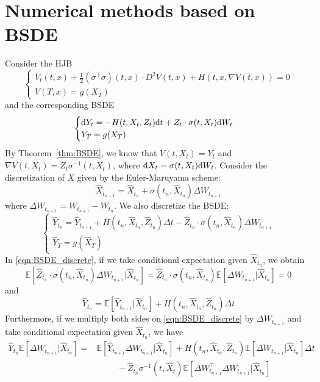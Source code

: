 \documentclass[11pt]{book}
\newcommand{\dd}{\text{\normalfont d}}
\newcommand{\dt}{\text{\normalfont d}t}
\newcommand{\dW}{\text{\normalfont d}W}
\begin{document}
    \section{Numerical methods based on BSDE}
\label{eqn:BSDE_numerical}
Consider the HJB
\begin{equation}
    \begin{cases}
    V_t(t,x)+\frac12(\sigma^{\intercal}\sigma)(t,x)\cdot D^2 V(t,x) + H(t,x,\nabla V(t,x)) = 0\\
    V(T,x) = g(X_T)
    \end{cases}
\end{equation}
and the corresponding BSDE
\begin{equation}
    \begin{cases}
        \dd Y_t = -H(t,{X}_t,Z_t)\dt + Z_t\cdot\sigma(t,X_t)\dW_t\\
        Y_T=g({X}_T)
    \end{cases}
\end{equation}
By Theorem~\eqref{thm:BSDE}, we know that $V(t,X_t) = Y_t$ and $\nabla V(t,X_t) = Z_t\sigma^{-1}(t,X_t)$, where $\dd X_t=\sigma(t,X_t)\dW_t$. 
Consider the discretization of $X$ given by the Euler-Maruyama scheme:
\[
\hat{X}_{t_{n+1}}=\hat{X}_{t_{n}} + \sigma(t_n,\hat{X}_{t_{n}})\Delta W_{t_{n+1}}
\]
where $\Delta W_{t_{n+1}}= W_{t_{n+1}}- W_{t_{n}}$.
We also discretize the BSDE:
\begin{equation}
\label{eqn:BSDE_discrete}
    \begin{cases}
        \hat{Y}_{t_n} = \hat{Y}_{t_{n+1}} +H(t_n,\hat{X}_{t_n},\hat{Z}_{t_n})\Delta t - \hat{Z}_{t_n}\cdot\sigma(t_n,\hat{X}_{t_n})\Delta W_{t_{n+1}}\\
        \hat{Y}_T=g(\hat{X}_T)
    \end{cases}
\end{equation}
In \eqref{eqn:BSDE_discrete}, if we take conditional expectation given $\hat{X}_{t_n}$, we obtain 
$$\mathbb{E}[\hat{Z}_{t_n}\cdot\sigma(t_n,\hat{X}_{t_n})\Delta W_{t_{n+1}}|\hat{X}_{t_n}]=\hat{Z}_{t_n}\cdot\sigma(t_n,\hat{X}_{t_n})\mathbb{E}[\Delta W_{t_{n+1}}|\hat{X}_{t_n}]=0$$
and 
\begin{equation}
    \hat{Y}_{t_n} = \mathbb{E}[\hat{Y}_{t_{n+1}}|\hat{X}_{t_n}] +H(t_n,\hat{X}_{t_n},\hat{Z}_{t_n})\Delta t
\end{equation}
Furthermore, if we multiply both sides on \eqref{eqn:BSDE_discrete} by $\Delta W_{t_{n+1}}$ and take conditional expectation given $\hat{X}_{t_n}$, we have
\begin{equation}
\begin{split}
    \hat{Y}_{t_n} \mathbb{E}[\Delta W_{t_{n+1}}|\hat{X}_{t_n}]= &\mathbb{E}[\hat{Y}_{t_{n+1}}\Delta W_{t_{n+1}}|\hat{X}_{t_n}] + H(t_n,\hat{X}_{t_n},\hat{Z}_{t_n})\mathbb{E}[\Delta W_{t_{n+1}}|\hat{X}_{t_n}]\Delta t \\
    &\hspace{1cm}- \hat{Z}_{t_n} \sigma^{-1}(t,\hat{X}_t)\mathbb{E}[\Delta W_{t_{n+1}}^\intercal\Delta W_{t_{n+1}}|\hat{X}_{t_n}]
\end{split}
\end{equation}
\end{document}
